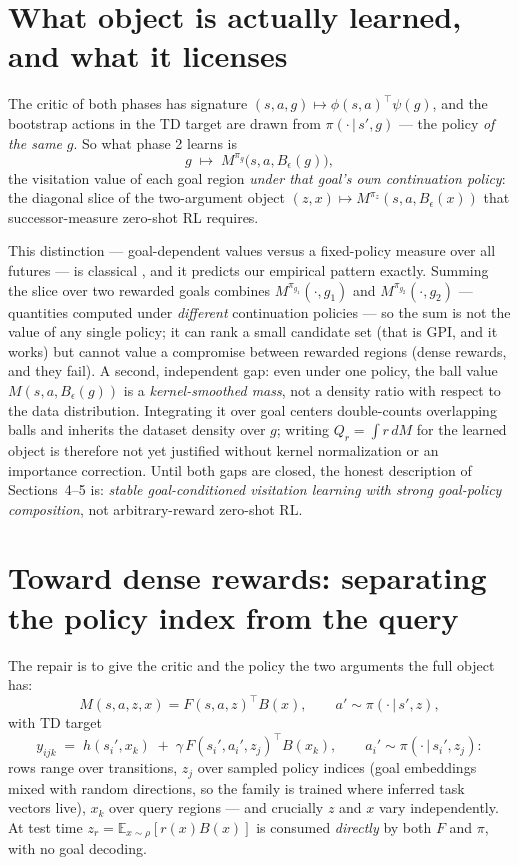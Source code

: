 \documentclass[10pt]{article}
\newcommand{\E}{\mathbb{E}}
\begin{document}
\section{What object is actually learned, and what it licenses}
\label{sec:object}

The critic of both phases has signature $(s,a,g)\mapsto \phi(s,a)^{\top}\psi(g)$, and the
bootstrap actions in the TD target are drawn from $\pi(\cdot\,|\,s',g)$ --- the policy
\emph{of the same} $g$.
So what phase 2 learns is
\[
g \;\longmapsto\; M^{\pi_g}\!\big(s,a,B_\epsilon(g)\big),
\]
the visitation value of each goal region \emph{under that goal's own continuation policy}:
the diagonal slice of the two-argument object
$(z,x)\mapsto M^{\pi_z}(s,a,B_\epsilon(x))$ that successor-measure zero-shot RL requires.

This distinction --- goal-dependent values versus a fixed-policy measure over all futures
--- is classical \citep{blier2021learning}, and it predicts our empirical pattern exactly.
Summing the slice over two rewarded goals combines $M^{\pi_{g_1}}(\cdot,g_1)$ and
$M^{\pi_{g_2}}(\cdot,g_2)$ --- quantities computed under \emph{different} continuation
policies --- so the sum is not the value of any single policy; it can rank a small
candidate set (that is GPI, and it works) but cannot value a compromise between rewarded
regions (dense rewards, and they fail).
A second, independent gap: even under one policy, the ball value
$M(s,a,B_\epsilon(g))$ is a \emph{kernel-smoothed mass}, not a density ratio with respect
to the data distribution.
Integrating it over goal centers double-counts overlapping balls and inherits the dataset
density over $g$; writing $Q_r=\int r\,dM$ for the learned object is therefore not yet
justified without kernel normalization or an importance correction.
Until both gaps are closed, the honest description of Sections~4--5 is: \emph{stable
goal-conditioned visitation learning with strong goal-policy composition}, not
arbitrary-reward zero-shot RL.

\section{Toward dense rewards: separating the policy index from the query}
\label{sec:dense}

The repair is to give the critic and the policy the two arguments the full object has:
\[
M(s,a,z,x)=F(s,a,z)^{\top}B(x),
\qquad
a'\sim\pi(\cdot\,|\,s',z),
\]
with TD target
\[
y_{ijk} \;=\; h(s_i', x_k) \;+\; \gamma\, F(s_i',a_i',z_j)^{\top}B(x_k),
\qquad a_i'\sim\pi(\cdot\,|\,s_i',z_j):
\]
rows range over transitions, $z_j$ over sampled policy indices (goal embeddings mixed with
random directions, so the family is trained where inferred task vectors live), $x_k$ over
query regions --- and crucially $z$ and $x$ vary independently.
At test time $z_r=\E_{x\sim\rho}[r(x)B(x)]$ is consumed \emph{directly} by both
$F$ and $\pi$, with no goal decoding.
\end{document}
